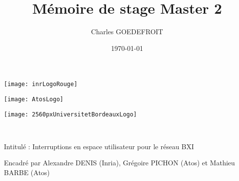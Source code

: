 \documentclass[11pt, a4paper]{article}
\title{Mémoire de stage Master 2}
\author{Charles GOEDEFROIT}
\date{\today}
\begin{document}
\begin{titlepage}
  \centering
  \begin{minipage}[t]{0.3\textwidth}
    \centering
    \vspace*{-2cm}
    \hspace*{-3.5cm}
    \texttt{[image: inrLogoRouge]}
  \end{minipage}\hfill
  \begin{minipage}[t]{0.3\textwidth}
    \centering
    \vspace*{-1.8cm}
    \hspace*{-0.5cm}
    \texttt{[image: AtosLogo]}
  \end{minipage}\hfill
  \begin{minipage}[t]{0.3\textwidth}
    \centering
    \vspace*{-2cm}
    \hspace*{0.5cm}
    \texttt{[image: 2560pxUniversitetBordeauxLogo]}
  \end{minipage}

  \ {} %
  \vfill
  \vspace{1cm}
  {\scshape\Huge\MyTitle\par}
  \vspace{0.5cm}
  {\LARGE\MySubject\par}
  \vspace{0.5cm}
  {\Large Intitulé : Interruptions en espace utilisateur pour le réseau BXI\par}
  \vspace{1cm}
  {\MyAuthor\par}
  {Encadré par Alexandre DENIS (Inria), Grégoire PICHON (Atos) et Mathieu BARBE (Atos)\par}
  \vfill
  {\large\MyDate\par}
\end{titlepage}

\newpage

\tableofcontents

\newpage








% 





\nocite{*}
\end{document}
